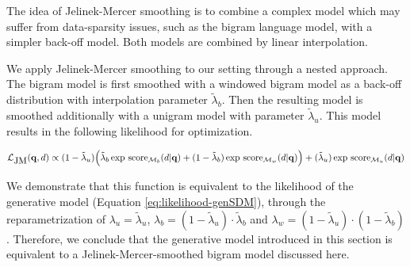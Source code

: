 \documentclass[]{article}
\begin{document}
The idea of Jelinek-Mercer smoothing is to combine a complex model
which may suffer from data-sparsity issues, such as the bigram language
model, with a simpler back-off model. Both models are combined by
linear interpolation.

We apply Jelinek-Mercer smoothing to our setting through a nested
approach. The bigram model is first smoothed with a windowed bigram
model as a back-off distribution with interpolation parameter $\tilde{\lambda}_{b}$.
Then the resulting model is smoothed additionally with a unigram model
with parameter $\tilde{\lambda}_{u}$. This model results in the following
likelihood for optimization.

\[
\mathcal{L}_{\mbox{JM}}(\mathbf{q},d)\propto(1-\tilde{\lambda}_{u})\Bigl(\tilde{\lambda}_{b}\exp\,\mbox{score}_{\mathcal{M}_{b}}(d|\mathbf{q})+ (1-\tilde{\lambda}_{b})\exp\,\mbox{score}_{\mathcal{M}_{w}}(d|\mathbf{q})\Bigr)+(\tilde{\lambda}_{u})\exp\,\mbox{score}_{\mathcal{M}_{u}}(d|\mathbf{q})
\]

We demonstrate that this function is equivalent to the likelihood
of the generative model (Equation \ref{eq:likelihood-genSDM}), through
the reparametrization of $\lambda_{u}=\tilde{\lambda}_{u}$, $\lambda_{b}=(1-\tilde{\lambda}_{u})\cdot\tilde{\lambda}_{b}$
and $\lambda_{w}=(1-\tilde{\lambda}_{u})\cdot(1-\tilde{\lambda}_{b})$.
Therefore, we conclude that the generative model introduced in this
section is equivalent to a Jelinek-Mercer-smoothed bigram model discussed
here. 
\end{document}
